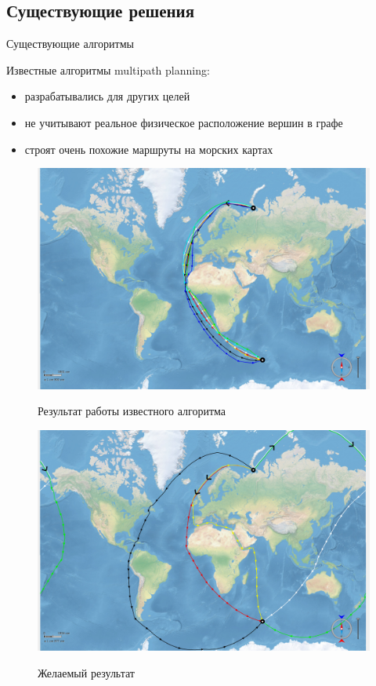 \documentclass[russian, hyperref={unicode}]{beamer}
\theoremstyle{definition}
\begin{document}
\subsection{Существующие решения}

\begin{frame}{Существующие алгоритмы}
     {
    Известные алгоритмы multipath planning:
    \begin{itemize}
        \item разрабатывались для других целей
        \item не учитывают реальное физическое расположение
          вершин в графе
        \item строят очень похожие маршруты на морских картах
    \end{itemize}
    }
     {
        \begin{figure}
            \includegraphics[width=.95\textwidth]{comparison-with-existing-bad}

            Результат работы известного алгоритма
        \end{figure}
    }
     {
        \begin{figure}
            \includegraphics[width=.95\textwidth]{comparison-with-existing-good}

            Желаемый результат
        \end{figure}
    }
\end{frame}
\end{document}
